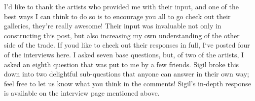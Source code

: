 I'd like to thank the artists who provided me with their input, and one of the best ways I can think to do so is to encourage you all to go check out their galleries, they're really awesome!  Their input was invaluable not only in constructing this post, but also increasing my own understanding of the other side of the trade.  If youd like to check out their responses in full, I`ve posted four of the interviews here.  I asked seven base questions, but, of two of the artists, I asked an eighth question that was put to me by a few friends.  Sigil broke this down into two delightful sub-questions that anyone can answer in their own way; feel free to let us know what you think in the comments!  Sigil's in-depth response is available on the interview page mentioned above.

